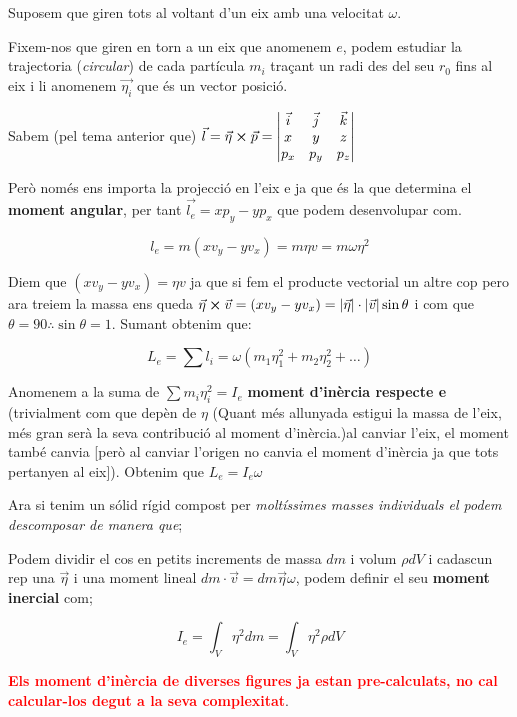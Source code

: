 \documentclass[12pt]{article}
\begin{document}
Suposem que giren tots al voltant d'un eix amb una velocitat $\omega$.

Fixem-nos que giren en torn a un eix que anomenem $e$, podem estudiar la trajectoria (\textit{circular}) de cada partícula $m_i$ traçant un radi des del seu $r_0$ fins al eix i li anomenem $\vec{\eta_i}$ que és un vector posició.

Sabem (pel tema anterior que) $\vec{l} = \vec{\eta} \cross \vec{p} = \begin{vmatrix}
    \vec{i} & \vec{j} & \vec{k} \\
    x & y & z \\
    p_x & p_y & p_z
\end{vmatrix}$

Però només ens importa la projecció en l'eix e ja que és la que determina el \textbf{moment angular}, per tant $\vec{l_e} = xp_y - yp_x$ que podem desenvolupar com.

\[l_e = m(xv_y - yv_x) = m\eta v = m\omega\eta^2\] 

Diem que $(xv_y - yv_x) = \eta v$ ja que si fem el producte vectorial un altre cop pero ara treiem la massa ens queda $\vec{\eta} \cross \vec{v} = (xv_y - yv_x) = \abs{\vec{\eta}} \cdot \abs{\vec{v}} \sin\theta$ i com que $\theta = 90 \therefore \sin \theta = 1$. Sumant obtenim que:

\[L_e = \sum l_i = \omega(m_1\eta_1^2 + m_2\eta_2^2 + \dots)\]

Anomenem a la suma de $\sum m_i\eta_i^2 = I_e$ \textbf{moment d'inèrcia respecte e} (trivialment com que depèn de $\eta$ (Quant més allunyada estigui la massa de l’eix, més gran serà la seva contribució al moment d’inèrcia.)al canviar l'eix, el moment també canvia [però al canviar l'origen no canvia el moment d'inèrcia ja que tots pertanyen al eix]). Obtenim que $\boxed{L_e = I_e\omega}$

Ara si tenim un sólid rígid compost per \textit{moltíssimes masses individuals el podem descomposar de manera que};

Podem dividir el cos en petits increments de massa $dm$ i volum $\rho dV$ i cadascun rep una $\vec{\eta}$ i una moment lineal $dm \cdot \vec{v} = dm \vec{\eta}\omega$, podem definir el seu \textbf{moment inercial} com;

\[I_e = \int_V \eta^2 dm = \int_V \eta^2 \rho dV\]

\textcolor{red}{\textbf{Els moment d'inèrcia de diverses figures ja estan pre-calculats, no cal calcular-los degut a la seva complexitat}}.
\end{document}
